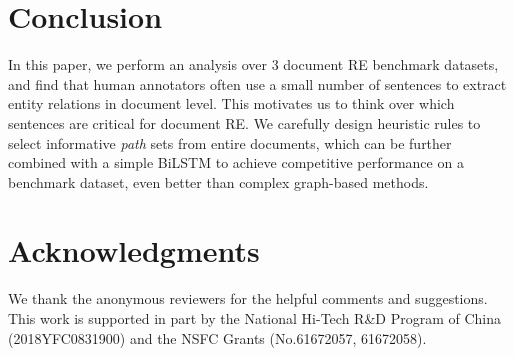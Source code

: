 \documentclass[11pt,a4paper]{article}
\begin{document}
\section{Conclusion}
In this paper, we perform an analysis over 3 document RE benchmark datasets, and find that human annotators often use a small number of sentences  to extract entity relations in document level. 
This motivates us to think over which sentences are critical for document RE. We carefully design heuristic rules to select informative \textit{path} sets from entire documents, which can be further combined with a simple BiLSTM to achieve competitive performance on a benchmark dataset, even better than complex graph-based methods.  


\section*{Acknowledgments}
We thank the anonymous reviewers for the helpful comments and suggestions. This work is supported in part by the National Hi-Tech R\&D Program of China (2018YFC0831900) and the NSFC Grants (No.61672057, 61672058).



\end{document}
